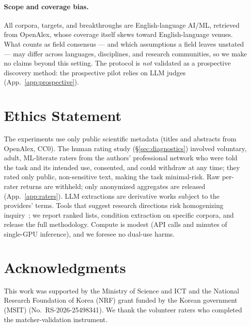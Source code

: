 \documentclass[11pt]{article}
\begin{document}
\paragraph{Scope and coverage bias.} All corpora, targets, and breakthroughs are English-language AI/ML, retrieved from OpenAlex, whose coverage itself skews toward English-language venues. What counts as field consensus --- and which assumptions a field leaves unstated --- may differ across languages, disciplines, and research communities, so we make no claims beyond this setting. The protocol is \emph{not} validated as a prospective discovery method: the prospective pilot relies on LLM judges (App.~\ref{app:prospective}).

\section*{Ethics Statement}

The experiments use only public scientific metadata (titles and abstracts from OpenAlex, CC0). The human rating study (\S\ref{sec:diagnostics}) involved voluntary, adult, ML-literate raters from the authors' professional network who were told the task and its intended use, consented, and could withdraw at any time; they rated only public, non-sensitive text, making the task minimal-risk. Raw per-rater returns are withheld; only anonymized aggregates are released (App.~\ref{app:raters}). LLM extractions are derivative works subject to the providers' terms. Tools that suggest research directions risk homogenizing inquiry~\cite{jiang2025hivemind}; we report ranked lists, condition extraction on specific corpora, and release the full methodology. Compute is modest (API calls and minutes of single-GPU inference), and we foresee no dual-use harms.

\section*{Acknowledgments}

This work was supported by the Ministry of Science and ICT and the National
Research Foundation of Korea (NRF) grant funded by the Korean government (MSIT)
(No.~RS-2026-25498341). We thank the volunteer raters who completed the
matcher-validation instrument.



\clearpage
\appendix
\raggedbottom
\end{document}
